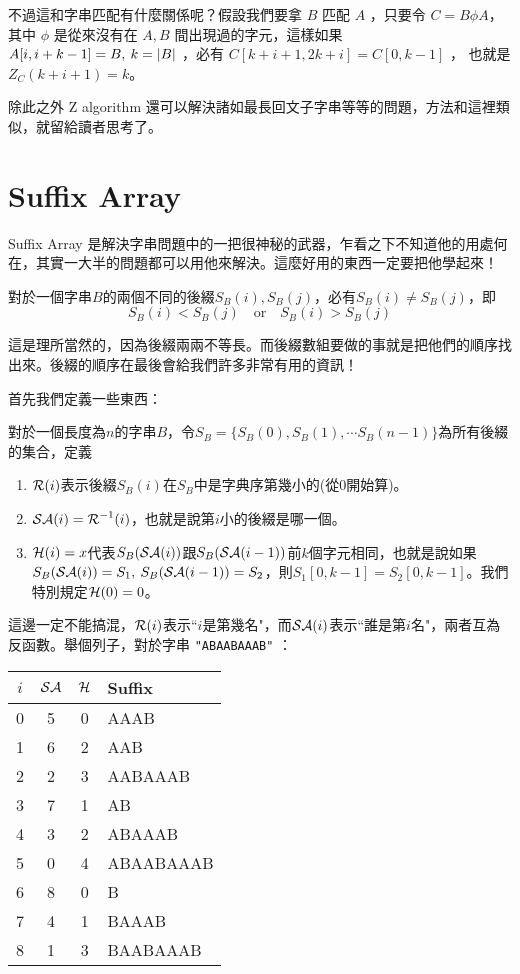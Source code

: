 \documentclass[a4paper,12pt]{book}
\begin{document}

不過這和字串匹配有什麼關係呢？假設我們要拿 $B$ 匹配 $A$ ，只要令 $C = B \phi A$，其中 $\phi$ 是從來沒有在 $A, B$ 間出現過的字元，這樣如果 $A[i, i+k-1] = B, \: k = \lvert B \rvert$ ，必有 $C[k+i+1, 2k+i] = C[0, k-1]$ ， 也就是
$ Z_C(k+i+1) = k $。

除此之外 Z algorithm 還可以解決諸如最長回文子字串等等的問題，方法和這裡類似，就留給讀者思考了。
\section{Suffix Array}
Suffix Array 是解決字串問題中的一把很神秘的武器，乍看之下不知道他的用處何在，其實一大半的問題都可以用他來解決。這麼好用的東西一定要把他學起來！\\

\begin{theorem}[定理]
  對於一個字串$B$的兩個不同的後綴$S_B(i), S_B(j)$，必有$S_B(i) \neq S_B(j)$，即
  \[ 
    S_B(i) < S_B(j) \quad \text{or} \quad S_B(i) > S_B(j)
  \]
\end{theorem}
這是理所當然的，因為後綴兩兩不等長。而後綴數組要做的事就是把他們的順序找出來。後綴的順序在最後會給我們許多非常有用的資訊！

首先我們定義一些東西：
\begin{theorem}[定義]
  對於一個長度為$n$的字串$B$，令$S_B = \{ S_B(0), S_B(1), \cdots S_B(n-1)\}$為所有後綴的集合，定義
  \begin{enumerate}
    \item $\operatorname{\mathcal{R}}(i)$表示後綴$S_B(i)$在$S_B$中是字典序第幾小的(從$0$開始算)。
    \item $\operatorname{\mathcal{SA}}(i) = \operatorname{\mathcal{R}}^{-1}(i)$，也就是說第$i$小的後綴是哪一個。
    \item $\operatorname{\mathcal{H}}(i) = x$代表$S_{B}(\operatorname{\mathcal{SA}}(i))$跟$S_{B}(\operatorname{\mathcal{SA}}(i-1))$前$k$個字元相同，也就是說如果$S_{B}(\operatorname{\mathcal{SA}}(i)) = S_1, \: S_{B}(\operatorname{\mathcal{SA}}(i-1)) = S_2$，則$S_1[0, k-1] = S_2[0, k-1]$。我們特別規定$\operatorname{\mathcal{H}}(0) = 0$。
  \end{enumerate}
\end{theorem}
這邊一定不能搞混，$\operatorname{\mathcal{R}}(i)$表示``$i$是第幾名"，而$\operatorname{\mathcal{SA}}(i)$表示``誰是第$i$名"，兩者互為反函數。舉個列子，對於字串 \texttt{"ABAABAAAB"} ：
\begin{center}
\begin{tabular}{c|c|c|l}
  $i$ & $\operatorname{\mathcal{SA}}$ & $\operatorname{\mathcal{H}}$ & Suffix \\\hline
  0 & 5 & 0 & AAAB \\
  1 & 6 & 2 & AAB \\
  2 & 2 & 3 & AABAAAB \\
  3 & 7 & 1 & AB \\
  4 & 3 & 2 & ABAAAB \\
  5 & 0 & 4 & ABAABAAAB \\
  6 & 8 & 0 & B \\
  7 & 4 & 1 & BAAAB \\
  8 & 1 & 3 & BAABAAAB
\end{tabular}
\end{center}
\end{document}
